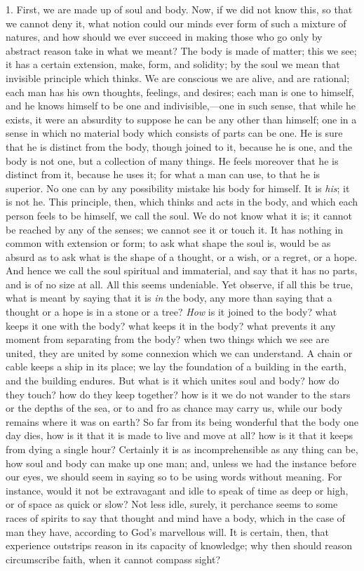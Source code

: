 1. First, we are made up of soul and body. Now, if we did not know
this, so that we cannot deny it, what notion could our minds ever form
of such a mixture of natures, and how should we ever succeed in making
those who go only by abstract reason take in what we meant? The body
is made of matter; this we see; it has a certain extension, make,
form, and solidity; by the soul we mean that invisible principle which
thinks. We are conscious we are alive, and are rational; each man has
his own thoughts, feelings, and desires; each man is one to himself,
and he knows himself to be one and indivisible,—one in such sense,
that while he exists, it were an absurdity to suppose he can be any
other than himself; one in a sense in which no material body which
consists of parts can be one. He is sure that he is distinct from the
body, though joined to it, because he is one, and the body is not one,
but a collection of many things. He feels moreover that he is distinct
from it, because he uses it; for what a man can use, to that he is
superior. No one can by any possibility mistake his body for himself.
It is \emph{his}; it is not he. This principle, then, which thinks and
acts in the body, and which each person feels to be himself, we call
the soul. We do not know what it is; it cannot be reached by any of
the senses; we cannot see it or touch it. It has nothing in common
with extension or form; to ask what shape the soul is, would be as
absurd as to ask what is the shape of a thought, or a wish, or a
regret, or a hope. And hence we call the soul spiritual and
immaterial, and say that it has no parts, and is of no size at all.
All this seems undeniable. Yet observe, if all this be true, what is
meant by saying that it is \emph{in} the body, any more than saying
that a thought or a hope is in a stone or a tree? \emph{How} is it
joined to the body? what keeps it one with the body? what keeps it in
the body? what prevents it any moment from separating from the body?
when two things which we see are united, they are united by some
connexion which we can understand. A chain or cable keeps a ship in
its place; we lay the foundation of a building in the earth, and the
building endures. But what is it which unites soul and body? how do
they touch? how do they keep together? how is it we do not wander to
the stars or the depths of the sea, or to and fro as chance may carry
us, while our body remains where it was on earth? So far from its
being wonderful that the body one day dies, how is it that it is made
to live and move at all? how is it that it keeps from dying a single
hour? Certainly it is as incomprehensible as any thing can be, how
soul and body can make up one man; and, unless we had the instance
before our eyes, we should seem in saying so to be using words without
meaning. For instance, would it not be extravagant and idle to speak
of time as deep or high, or of space as quick or slow? Not less idle,
surely, it perchance seems to some races of spirits to say that
thought and mind have a body, which in the case of man they have,
according to God's marvellous will. It is certain, then, that
experience outstrips reason in its capacity of knowledge; why then
should reason circumscribe faith, when it cannot compass sight?

